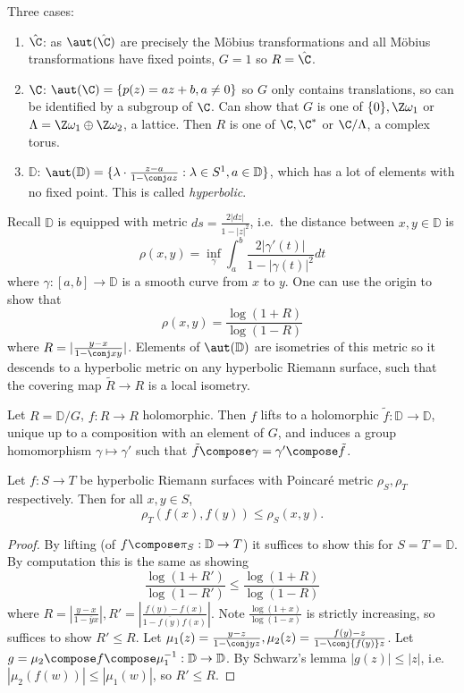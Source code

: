 \documentclass[a4paper]{article}
\newcommand{\D}{\mathbb{D}}
\begin{document}
Three cases:
\begin{enumerate}
\item \(\hat \C\): as \(\aut(\hat \C)\) are precisely the Möbius transformations and all Möbius transformations have fixed points, \(G = 1\) so \(R = \hat \C\).
\item \(\C\): \(\aut(\C) = \{p(z) = az + b, a \ne 0\}\) so \(G\) only contains translations, so can be identified by a subgroup of \(\C\). Can show that \(G\) is one of \(\{0\}, \Z \omega_1\) or \(\Lambda = \Z\omega_1 \oplus \Z\omega_2\), a lattice. Then \(R\) is one of \(\C, \C^*\) or \(\C/\Lambda\), a complex torus.
\item \(\D\): \(\aut(\D) = \{\lambda \cdot \frac{z - a}{1 - \conj a z}: \lambda \in S^1, a \in \D\}\), which has a lot of elements with no fixed point. This is called \emph{hyperbolic}.
\end{enumerate}

Recall \(\D\) is equipped with metric \(ds = \frac{2 |dz|}{1 - |z|^2}\), i.e.\ the distance between \(x, y \in \D\) is
\[
  \rho(x, y) = \inf_\gamma \int_a^b \frac{2 |\gamma'(t)|}{1 - |\gamma(t)|^2} dt
\]
where \(\gamma: [a, b] \to \D\) is a smooth curve from \(x\) to \(y\). One can use the origin to show that
\[
  \rho(x, y) = \frac{\log(1 + R)}{\log(1 - R)}
\]
where \(R = |\frac{y - x}{1 - \conj x y}|\). Elements of \(\aut(\D)\) are isometries of this metric so it descends to a hyperbolic metric on any hyperbolic Riemann surface, such that the covering map \(\tilde R \to R\) is a local isometry.

\begin{ex}
  Let \(R = \D/G\), \(f: R \to R\) holomorphic. Then \(f\) lifts to a holomorphic \(\tilde f: \D \to \D\), unique up to a composition with an element of \(G\), and induces a group homomorphism \(\gamma \mapsto \gamma'\) such that \(\tilde f \compose \gamma = \gamma' \compose \tilde f\).
\end{ex}

\begin{theorem}[Pick]
  Let \(f: S \to T\) be hyperbolic Riemann surfaces with Poincaré metric \(\rho_S, \rho_T\) respectively. Then for all \(x, y \in S\),
  \[
    \rho_T(f(x), f(y)) \leq \rho_S(x, y).
  \]
\end{theorem}

\begin{proof}
  By lifting (of \(f \compose \pi_S: \D \to T\)) it suffices to show this for \(S = T = \D\). By computation this is the same as showing
  \[
    \frac{\log (1 + R')}{\log (1 - R')} \leq \frac{\log (1 + R)}{\log (1 - R)}
  \]
  where \(R = |\frac{y - x}{1 - \overline y x}|, R' = |\frac{f(y) - f(x)}{1 - \overline{f(y)} f(x)}|\). Note \(\frac{\log (1 + x)}{\log (1 - x)}\) is strictly increasing, so suffices to show \(R' \leq R\). Let \(\mu_1(z) = \frac{y - z}{1 - \conj y z}, \mu_2(z) = \frac{f(y) - z}{1 - \conj{f(y)} z}\). Let \(g = \mu_2 \compose f \compose \mu_1^{-1}: \D \to \D\). By Schwarz's lemma \(|g(z)| \leq |z|\), i.e.\ \(|\mu_2(f(w))| \leq |\mu_1(w)|\), so \(R' \leq R\).
\end{proof}
\end{document}

